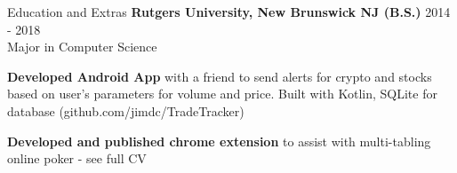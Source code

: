 \documentclass{resume} %
\begin{document}

\begin{rSection}{Education and Extras}
\vspace{1mm}
{\bf Rutgers University, New Brunswick NJ (B.S.)} \hfill {2014 - 2018} 
\\ Major in Computer Science
\vspace{-1mm}
\item \textbf{Developed Android App} with a friend to send alerts for crypto and stocks based on user’s parameters for volume and price. Built with Kotlin, SQLite for database (github.com/jimdc/TradeTracker)
\vspace{-1mm}
\item \textbf{Developed and published chrome extension} to assist with multi-tabling online poker - see full CV

\end{rSection}
\end{document}
